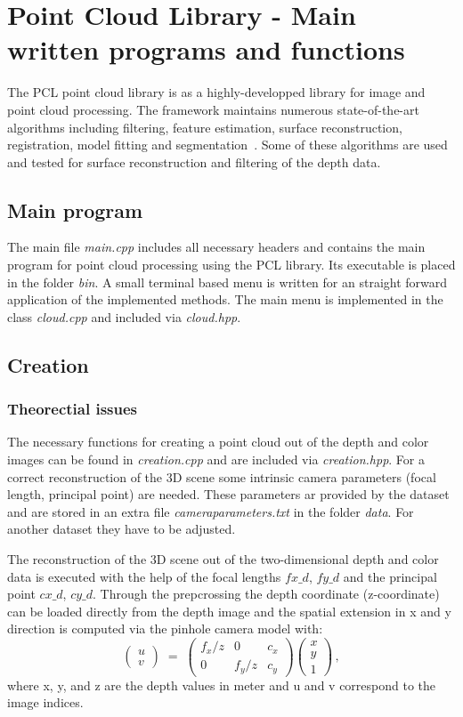 \documentclass[paper=a4,11pt,bibliography=totoc]{scrartcl}
\begin{document}
\section{Point Cloud Library - Main written programs and functions}
%
The PCL point cloud library is as a highly-developped library for image and point cloud processing. The framework maintains numerous state-of-the-art algorithms including filtering, feature estimation, surface reconstruction, registration, model fitting and segmentation~\cite{pcldoc}. Some of these algorithms are used and tested for surface reconstruction and filtering of the depth data.
%
\subsection{Main program}
%
The main file \textit{main.cpp} includes all necessary headers and contains the main program for point cloud processing using the PCL library. Its executable is placed in the folder \textit{bin}. A small terminal based menu is written for an straight forward application of the implemented methods. The main menu is implemented in the class \textit{cloud.cpp} and included via \textit{cloud.hpp}.
%
\subsection{Creation}
\subsubsection*{\color{darkgreen}Theorectial issues}
%
The necessary functions for creating a point cloud out of the depth and color images can be found in \textit{creation.cpp} and are included via \textit{creation.hpp}. For a correct reconstruction of the 3D scene some intrinsic camera parameters (focal length, principal point) are needed. These parameters ar provided by the dataset and are stored in an extra file \textit{cameraparameters.txt} in the folder \textit{data}. For another dataset they have to be adjusted.

The reconstruction of the 3D scene out of the two-dimensional depth and color data is executed with the help of the focal lengths $fx\_d$, $fy\_d$ and the principal point $cx\_d$, $cy\_d$. Through the prepcrossing the depth coordinate (z-coordinate) can be loaded directly from the depth image and the spatial extension in x and y direction is computed via the pinhole camera model with:
%
\begin{equation}
\begin{pmatrix}
u\\v
\end{pmatrix}
\;=\;
\begin{pmatrix}
f_x/z & 0 & c_x \\
0 & f_y/z & c_y
\end{pmatrix}
\begin{pmatrix}
x\\y\\1
\end{pmatrix}\,,
\end{equation}
%
where x, y, and z are the depth values in meter and u and v correspond to the image indices.
%
\end{document}

